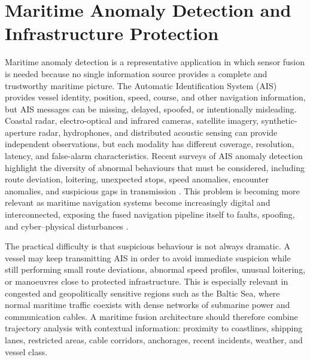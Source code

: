 \documentclass[11pt,oneside,openany]{book}
\begin{document}
\section{Maritime Anomaly Detection and Infrastructure Protection}

Maritime anomaly detection is a representative application in which sensor fusion is needed because no single information source provides a complete and trustworthy maritime picture. The Automatic Identification System (AIS) provides vessel identity, position, speed, course, and other navigation information, but AIS messages can be missing, delayed, spoofed, or intentionally misleading. Coastal radar, electro-optical and infrared cameras, satellite imagery, synthetic-aperture radar, hydrophones, and distributed acoustic sensing can provide independent observations, but each modality has different coverage, resolution, latency, and false-alarm characteristics. Recent surveys of AIS anomaly detection highlight the diversity of abnormal behaviours that must be considered, including route deviation, loitering, unexpected stops, speed anomalies, encounter anomalies, and suspicious gaps in transmission \cite{wolsing_anomaly_2022}. This problem is becoming more relevant as maritime navigation systems become increasingly digital and interconnected, exposing the fused navigation pipeline itself to faults, spoofing, and cyber--physical disturbances \cite{oliva_innovation_2026}.

The practical difficulty is that suspicious behaviour is not always dramatic. A vessel may keep transmitting AIS in order to avoid immediate suspicion while still performing small route deviations, abnormal speed profiles, unusual loitering, or manoeuvres close to protected infrastructure. This is especially relevant in congested and geopolitically sensitive regions such as the Baltic Sea, where normal maritime traffic coexists with dense networks of submarine power and communication cables. A maritime fusion architecture should therefore combine trajectory analysis with contextual information: proximity to coastlines, shipping lanes, restricted areas, cable corridors, anchorages, recent incidents, weather, and vessel class.
\end{document}
